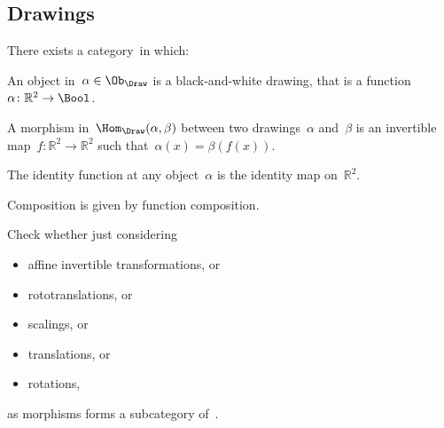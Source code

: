 \subsection{Drawings}


\begin{definition}
There exists a category~\Draw in which:
\begin{compactenum}
\item An object in~$\alpha\in \Ob_\Draw$ is a black-and-white drawing,
that is a function~$\alpha \colon \mathbb{R}^2 \to \Bool$.
\item A morphism in~$\Hom_{\Draw}(\alpha, \beta)$ between two drawings~$\alpha$ and~$\beta$ is an invertible map~$f\colon \mathbb{R}^2 \to \mathbb{R}^2$ such that~$\alpha(x) = \beta(f(x))$.
\item The identity function at any object~$\alpha$ is the identity map 
on~$\mathbb{R}^2$. 
\item Composition is given by function composition. 
\end{compactenum}
\end{definition}
 
\begin{exercise}
Check whether just considering
    \begin{itemize}
        \item affine invertible transformations, or
        \item rototranslations, or
        \item scalings, or
        \item translations, or
        \item rotations,
    \end{itemize}
as morphisms forms a subcategory of~\Draw.
 \end{exercise}
 
